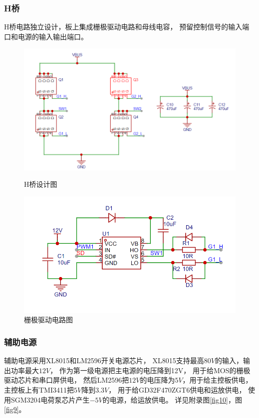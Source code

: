 \documentclass[a4paper,12pt]{article}
\begin{document}
\subsubsection{H桥}
H桥电路独立设计，板上集成栅极驱动电路和母线电容，
预留控制信号的输入端口和电源的输入输出端口。
\begin{figure}[htbp]
    \centering
    \begin{minipage}{0.45\textwidth}
        \centering
        \includegraphics[width=1\textwidth]{src/fig6.png}
        \caption{H桥设计图}
    \end{minipage}
    \quad
    \begin{minipage}{0.45\textwidth}
        \centering
        \includegraphics[width=1\textwidth]{src/fig7.png}
        \caption{栅极驱动电路图}
    \end{minipage}
\end{figure}
\newpage
\subsubsection{辅助电源}
辅助电源采用XL8015和LM2596开关电源芯片，
XL8015支持最高$80V$的输入，输出功率最大$12V$，
作为第一级电源把主电源的电压降到12V，
用于给MOS的栅极驱动芯片和串口屏供电，
然后LM2596把$12V$的电压降为$5V$，用于给主控板供电，
主控板上有TMI3411把$5V$降到$3.3V$，
用于给GD32F470ZGT6供电和运放供电，
使用SGM3204电荷泵芯片产生$-5V$的电源，给运放供电。
详见附录图\ref{fig10}，图\ref{fig9}。
\end{document}
